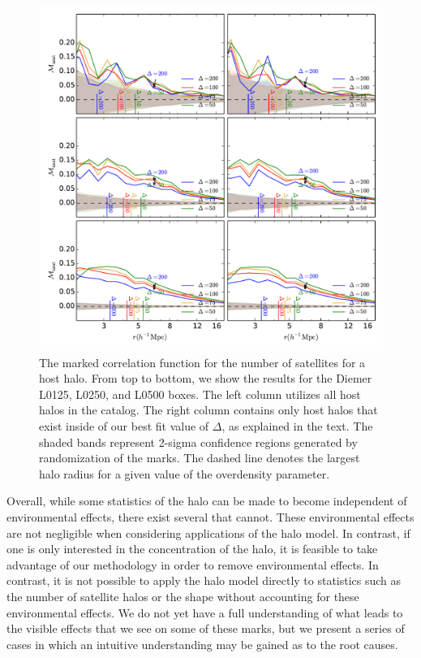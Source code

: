 \documentclass[usenatbib,usegraphicx,letterpaper]{mn2e}
\begin{document}
\begin{figure}
	\centering
	\includegraphics[width=\textwidth]{all_mcf_nsat_z00_hostsvmatch.pdf}
	\caption{The marked correlation function for the number of satellites for a host halo. From top to bottom, we show the results for the Diemer L0125, L0250, and L0500 boxes. The left column utilizes all host halos in the catalog. The right column contains only host halos that exist inside of our best fit value of $\Delta$, as explained in the text. The shaded bands represent 2-sigma confidence regions generated by randomization of the marks. The dashed line denotes the largest halo radius for a given value of the overdensity parameter.}
\end{figure}

Overall, while some statistics of the halo can be made to become independent of environmental effects, there exist several that cannot. These environmental effects are not negligible when considering applications of the halo model. In contrast, if one is only interested in the concentration of the halo, it is feasible to take advantage of our methodology in order to remove environmental effects. In contrast, it is not possible to apply the halo model directly to statistics such as the number of satellite halos or the shape without accounting for these environmental effects. We do not yet have a full understanding of what leads to the visible effects that we see on some of these marks, but we present a series of cases in which an intuitive understanding may be gained as to the root causes.
\end{document}

